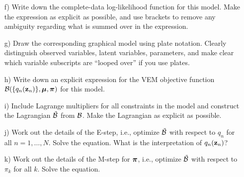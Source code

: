 \documentclass{amsmlaj}
\begin{document}
\begin{problem}
\begin{itemize}
  \item[f)] Write down the complete-data log-likelihood function for this model. Make the expression as explicit as possible, and use brackets to remove any ambiguity regarding what is summed over in the expression. 
  \item[g)] Draw the corresponding graphical model using plate notation. Clearly distinguish observed variables, latent variables, parameters, and make clear which variable subscripts are ``looped over'' if you use plates.
  \item[h)] Write down an explicit expression for the VEM objective function ${\mathcal{B}}(\{q_n(\bm{\mathbf{z}}_n)\},\bm{\mathbf{\mu}},\bm{\mathbf{\pi}})$ for this model.
  \item[i)] Include Lagrange multipliers for all constraints in the model and construct the Lagrangian ${\mathcal{\tilde{B}}}$ from ${\mathcal{B}}$. Make the Lagrangian as explicit as possible. 
  \item[j)] Work out the details of the E-step, i.e., optimize ${\mathcal{\tilde{B}}}$ with respect to $q_n$ for all $n=1,\dots,N$. Solve the equation. What is the interpretation of $q_n(\bm{\mathbf{z}}_n)$? 
  \item[k)] Work out the details of the M-step for $\bm{\mathbf{\pi}}$, i.e., optimize ${\mathcal{\tilde{B}}}$ with respect to $\pi_k$ for all $k$. Solve the equation. 
  \end{itemize}
\end{problem}
\end{document}

